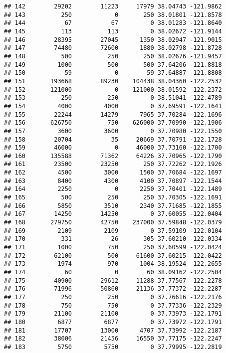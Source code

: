 \documentclass[
]{book}
\begin{document}
\begin{verbatim}
## 142        29202        11223     17979 38.04743 -121.9862
## 143          250            0       250 38.01801 -121.8578
## 144           67           67         0 38.01283 -121.8640
## 145          113          113         0 38.02672 -121.9144
## 146        28395        27045      1350 38.02947 -121.9015
## 147        74480        72600      1880 38.02798 -121.8728
## 148          500          250       250 38.02676 -121.9457
## 149         1000          500       500 37.64206 -121.8818
## 150           59            0        59 37.64887 -121.8808
## 151       193668        89230    104438 38.04360 -122.2532
## 152       121000            0    121000 38.01592 -122.2372
## 153          250          250         0 38.51041 -122.4789
## 154         4000         4000         0 37.69591 -122.1641
## 155        22244        14279      7965 37.70284 -122.1696
## 156       626750          750    626000 37.70990 -122.1906
## 157         3600         3600         0 37.70980 -122.1550
## 158        20704           35     20669 37.70791 -122.1728
## 159        46000            0     46000 37.73160 -122.1700
## 160       135588        71362     64226 37.70965 -122.1790
## 161        23500        23250       250 37.72262 -122.1926
## 162         4500         3000      1500 37.70684 -122.1697
## 163         8400         4300      4100 37.70897 -122.1544
## 164         2250            0      2250 37.70401 -122.1489
## 165          500          250       250 37.70305 -122.1691
## 166         5850         3510      2340 37.71685 -122.1855
## 167        14250        14250         0 37.60055 -122.0404
## 168       279750        42750    237000 37.59848 -122.0379
## 169         2109         2109         0 37.59109 -122.0104
## 170          331           26       305 37.60210 -122.0334
## 171         1000          750       250 37.60599 -122.0424
## 172        62100          500     61600 37.60215 -122.0422
## 173         1974          970      1004 38.19524 -122.2655
## 174           60            0        60 38.09162 -122.2504
## 175        40900        29612     11288 37.77567 -122.2278
## 176        71996        50860     21136 37.77372 -122.2287
## 177          250          250         0 37.76616 -122.2176
## 178          750          750         0 37.77336 -122.2329
## 179        21100        21100         0 37.73973 -122.1791
## 180         6877         6877         0 37.73972 -122.1791
## 181        17707        13000      4707 37.73992 -122.2187
## 182        38006        21456     16550 37.77175 -122.2247
## 183         5750         5750         0 37.79995 -122.2819

\end{verbatim}
\end{document}
